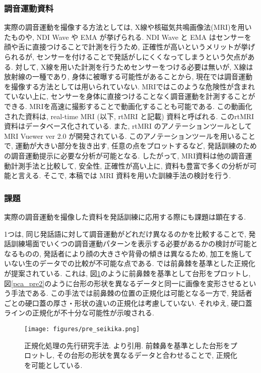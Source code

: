 \subsubsection{調音運動資料}
実際の調音運動を撮像する方法としては, X線や核磁気共鳴画像法(MRI)を用いたものや, NDI Wave や EMA が挙げられる.
NDI Wave と EMA はセンサーを顔や舌に直接つけることで計測を行うため, 正確性が高いというメリットが挙げられるが, センサーを付けることで発話がしにくくなってしまうという欠点がある. 対して, X線を用いた計測を行うためセンサーをつける必要は無いが, X線は放射線の一種であり, 身体に被曝する可能性があることから, 現在では調音運動を撮像する方法としては用いられていない.
MRIではこのような危険性が含まれていない上に, センサーを身体に直接つけることなく調音運動を計測することができる. MRIを高速に撮影することで動画化することも可能である. この動画化された資料は, real-time MRI (以下, rtMRI と記載) 資料と呼ばれる. このrtMRI資料はデータベース\cite{rtMRI}化されている.
また, rtMRI のアノテーションツールとして MRI Vuewer ver 2.0 \cite{MRI_Vuewer}が開発されている. このアノテーションツールを用いることで, 運動が大きい部分を抜き出す, 任意の点をプロットするなど, 発話訓練のための調音運動提示に必要な分析が可能となる.
したがって, MRI資料は他の調音運動計測手法と比較して, 安全性, 正確性が高い上に, 資料も豊富で多くの分析が可能と言える. そこで, 本稿では MRI 資料を用いた訓練手法の検討を行う.

\subsubsection{課題}\label{section_kadai}
実際の調音運動を撮像した資料を発話訓練に応用する際にも課題は顕在する.

1つは, 同じ発話語に対して調音運動がどれだけ異なるのかを比較することで, 発話訓練場面でいくつの調音運動パターンを表示する必要があるかの検討が可能となるものの, 発話者により顔の大きさや背骨の傾きは異なるため, 加工を施していない生のデータでの比較が不可能な点である.
\cite{honda_seikika}では前鼻棘を基準とした正規化が提案されている. これは, 図\ref{pca_pre}のように前鼻棘を基準として台形をプロットし, 図\ref{pca_pre2}のように台形の形状を異なるデータと同一に画像を変形させるという手法である.
この手法では前鼻棘の位置の正規化は可能となる一方で, 発話者ごとの硬口蓋の厚さ・形状の違いの正規化は考慮していない. それゆえ, 硬口蓋ラインの正規化が不十分な可能性が示唆される.

\begin{figure}[hbtp]
 \centering
   \texttt{[image: figures/pre\_seikika.png]}
 \caption[正規化処理の先行研究手法]{正規化処理の先行研究手法. \cite{honda_seikika}より引用. 前棘鼻を基準とした台形をプロットし, その台形の形状を異なるデータと合わせることで, 正規化を可能としている. }
 \label{pca_pre}
\end{figure}

